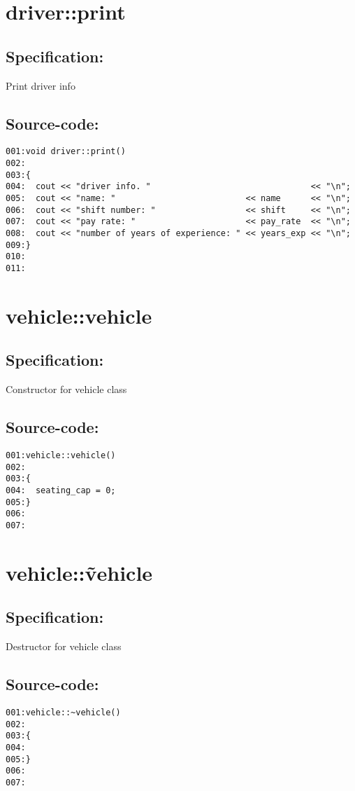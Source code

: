 \section{driver::print}
\subsection*{Specification:}
Print driver info
\subsection*{Source-code:}
\begin{verbatim}
001:void driver::print()
002:
003:{
004:  cout << "driver info. "                                << "\n";
005:  cout << "name: "                          << name      << "\n";
006:  cout << "shift number: "                  << shift     << "\n";
007:  cout << "pay rate: "                      << pay_rate  << "\n";
008:  cout << "number of years of experience: " << years_exp << "\n";
009:}
010:
011:
\end{verbatim}
\section{vehicle::vehicle}
\subsection*{Specification:}
Constructor for vehicle class
\subsection*{Source-code:}
\begin{verbatim}
001:vehicle::vehicle()
002:
003:{
004:  seating_cap = 0;
005:}
006:
007:
\end{verbatim}
\section{vehicle::\~vehicle}
\subsection*{Specification:}
Destructor for vehicle class
\subsection*{Source-code:}
\begin{verbatim}
001:vehicle::~vehicle()
002:
003:{
004:
005:}
006:
007:
\end{verbatim}
